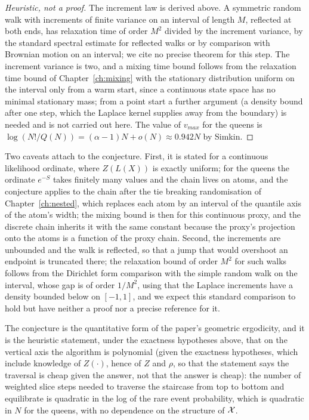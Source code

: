 \begin{proof}[Heuristic, not a proof]
The increment law is derived above. A symmetric random walk with increments of finite variance on an interval of length $M$, reflected at both ends, has relaxation time of order $M^2$ divided by the increment variance, by the standard spectral estimate for reflected walks or by comparison with Brownian motion on an interval; we cite no precise theorem for this step. The increment variance is two, and a mixing time bound follows from the relaxation time bound of Chapter~\ref{ch:mixing} with the stationary distribution uniform on the interval only from a warm start, since a continuous state space has no minimal stationary mass; from a point start a further argument (a density bound after one step, which the Laplace kernel supplies away from the boundary) is needed and is not carried out here. The value of $v_{max}$ for the queens is $\log(N! / Q(N)) = (\alpha - 1) N + o(N) \approx 0.942 N$ by Simkin.
\end{proof}

Two caveats attach to the conjecture. First, it is stated for a continuous likelihood ordinate, where $Z(L(X))$ is exactly uniform; for the queens the ordinate $e^{-S}$ takes finitely many values and the chain lives on atoms, and the conjecture applies to the chain after the tie breaking randomisation of Chapter~\ref{ch:nested}, which replaces each atom by an interval of the quantile axis of the atom's width; the mixing bound is then for this continuous proxy, and the discrete chain inherits it with the same constant because the proxy's projection onto the atoms is a function of the proxy chain. Second, the increments are unbounded and the walk is reflected, so that a jump that would overshoot an endpoint is truncated there; the relaxation bound of order $M^2$ for such walks follows from the Dirichlet form comparison with the simple random walk on the interval, whose gap is of order $1/M^2$, using that the Laplace increments have a density bounded below on $[-1, 1]$, and we expect this standard comparison to hold but have neither a proof nor a precise reference for it.

The conjecture is the quantitative form of the paper's geometric ergodicity, and it is the heuristic statement, under the exactness hypotheses above, that on the vertical axis the algorithm is polynomial (given the exactness hypotheses, which include knowledge of $Z(\cdot)$, hence of $Z$ and $\rho$, so that the statement says the traversal is cheap given the answer, not that the answer is cheap): the number of weighted slice steps needed to traverse the staircase from top to bottom and equilibrate is quadratic in the log of the rare event probability, which is quadratic in $N$ for the queens, with no dependence on the structure of $\mathcal{X}$.

